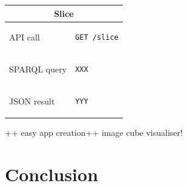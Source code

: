 \documentclass{llncs}
\begin{document}
\begin{table}
\begin{tabular}{|l|l|}
\multicolumn{2}{|c|}{\textbf{Slice}}\\

\hline
API call &
\begin{minipage}[t]{4.5in}
 \begin{verbatim} 
GET /slice
\end{verbatim}
\end{minipage}\\\hline

SPARQL query  &
\begin{minipage}[t]{4.5in}
 \begin{verbatim} 
XXX
\end{verbatim}
\end{minipage}\\ \hline

JSON result &
\begin{minipage}[t]{4.5in}
 \begin{verbatim} 
YYY 
\end{verbatim}
\end{minipage}\\\hline


\end{tabular}
\label{tbl:apiexamplecall}
\end{table}




++ easy app creation++ image cube visualiser!


\section{Conclusion}\label{sec:conclusion}






\end{document}
